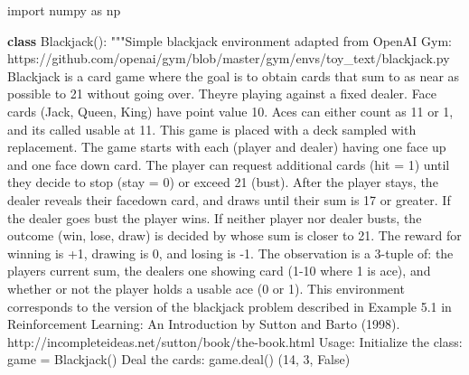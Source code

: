\documentclass[
  letterpaper,
  DIV=11,
  numbers=noendperiod]{scrartcl}
\newenvironment{Shaded}{\begin{snugshade}}{\end{snugshade}}
\newcommand{\CommentTok}[1]{\textcolor[rgb]{0.37,0.37,0.37}{#1}}
\newcommand{\ImportTok}[1]{\textcolor[rgb]{0.00,0.46,0.62}{#1}}
\newcommand{\KeywordTok}[1]{\textcolor[rgb]{0.00,0.23,0.31}{\textbf{#1}}}
\newcommand{\NormalTok}[1]{\textcolor[rgb]{0.00,0.23,0.31}{#1}}
\begin{document}
\begin{Shaded}
\begin{Highlighting}[]
\ImportTok{import}\NormalTok{ numpy }\ImportTok{as}\NormalTok{ np}

\KeywordTok{class}\NormalTok{ Blackjack():}
    \CommentTok{"""Simple blackjack environment adapted from OpenAI Gym:}
\CommentTok{        https://github.com/openai/gym/blob/master/gym/envs/toy\_text/blackjack.py}
\CommentTok{    }
\CommentTok{    Blackjack is a card game where the goal is to obtain cards that sum to as}
\CommentTok{    near as possible to 21 without going over.  They\textquotesingle{}re playing against a fixed}
\CommentTok{    dealer.}
\CommentTok{    }
\CommentTok{    Face cards (Jack, Queen, King) have point value 10.}
\CommentTok{    Aces can either count as 11 or 1, and it\textquotesingle{}s called \textquotesingle{}usable\textquotesingle{} at 11.}
\CommentTok{    This game is placed with a deck sampled with replacement.}
\CommentTok{    }
\CommentTok{    The game starts with each (player and dealer) having one face up and one}
\CommentTok{    face down card.}
\CommentTok{    }
\CommentTok{    The player can request additional cards (hit = 1) until they decide to stop}
\CommentTok{    (stay = 0) or exceed 21 (bust).}
\CommentTok{    }
\CommentTok{    After the player stays, the dealer reveals their facedown card, and draws}
\CommentTok{    until their sum is 17 or greater.  If the dealer goes bust the player wins.}
\CommentTok{    If neither player nor dealer busts, the outcome (win, lose, draw) is}
\CommentTok{    decided by whose sum is closer to 21.  The reward for winning is +1,}
\CommentTok{    drawing is 0, and losing is {-}1.}
\CommentTok{    }
\CommentTok{    The observation is a 3{-}tuple of: the players current sum,}
\CommentTok{    the dealer\textquotesingle{}s one showing card (1{-}10 where 1 is ace),}
\CommentTok{    and whether or not the player holds a usable ace (0 or 1).}
\CommentTok{    }
\CommentTok{    This environment corresponds to the version of the blackjack problem}
\CommentTok{    described in Example 5.1 in Reinforcement Learning: An Introduction}
\CommentTok{    by Sutton and Barto (1998).}
\CommentTok{    }
\CommentTok{    http://incompleteideas.net/sutton/book/the{-}book.html}
\CommentTok{    }
\CommentTok{    Usage: }
\CommentTok{        Initialize the class:}
\CommentTok{            game = Blackjack()}
\CommentTok{        }
\CommentTok{        Deal the cards:}
\CommentTok{            game.deal()}
\CommentTok{            }
\CommentTok{             (14, 3, False)}
\CommentTok{             }

\end{Highlighting}
\end{Shaded}
\end{document}
